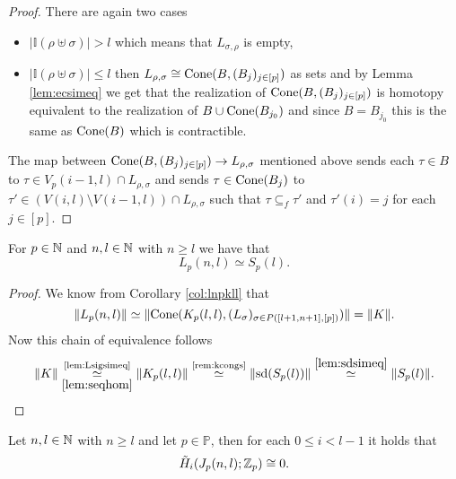 \begin{proof}
  There are again two cases
  \begin{itemize}
    \item $\left|\mathbb{I}(\rho \uplus \sigma)\right| > l$ which means that $L_{\sigma,\rho}$ is empty,
    \item $\left|\mathbb{I}(\rho \uplus \sigma)\right| \leq l$ then $L_{\rho, \sigma} \cong {\rm Cone}(B, (B_j)_{j\in [p]})$ as sets and by Lemma \ref{lem:ecsimeq} we get that the realization of ${\rm Cone}(B, (B_j)_{j \in [p]})$ is homotopy equivalent to the realization of $B \cup {\rm Cone}(B_{j_0})$ and since $B = B_{j_0}$ this is the same as ${\rm Cone}(B)$ which is contractible.
    \end{itemize}
    The map between ${\rm Cone}(B, (B_j)_{j\in [p]}) \to L_{\rho, \sigma}$ mentioned above sends each $\tau \in B$ to $\tau \in V_p(i-1, l) \cap L_{\rho, \sigma}$ and sends $\tau \in {\rm Cone}(B_j)$ to $\tau' \in (V(i,l) \setminus V(i-1,l))\cap L_{\rho,\sigma}$ such that $\tau \subseteq_f \tau'$ and $\tau'(i) = j$ for each $j \in [p]$.
\end{proof}

\begin{col}
  For $p \in \mathbb{N}$ and $n,l\in \mathbb{N}$ with $n \geq l$ we have that \[L_p(n,l) \simeq S_p(l).\]
\end{col}

\begin{proof}
  We know from Corollary \ref{col:lnpkll} that \[\lVert L_p(n,l) \rVert \simeq \lVert{\rm Cone}(K_p(l,l), (L_\sigma)_{\sigma\in P([l+1,n+1],[p])})\rVert = \lVert K \rVert.\] Now this chain of equivalence follows
  \begin{equation*}
    \lVert K \rVert \underset{\ref{lem:seqhom}}{\overset{\text{\ref{lem:Lsigsimeq}}}{\simeq}} \lVert K_p(l,l) \rVert \overset{\text{\ref{rem:kcongs}}}{\simeq} \lVert {\rm sd}(S_p(l)) \rVert \overset{\ref{lem:sdsimeq}}{\simeq} \lVert S_p(l) \rVert.
  \end{equation*}
\end{proof}

\begin{lemma}\label{lem:jc0}
  Let $n,l \in \mathbb{N}$ with $n \geq l$ and let $p \in \mathbb{P}$, then for each $0 \leq i < l-1$ it holds that
  \begin{equation*}
    \tilde{H}_i(J_p(n,l); \mathbb{Z}_p) \cong 0.
  \end{equation*}
\end{lemma}

